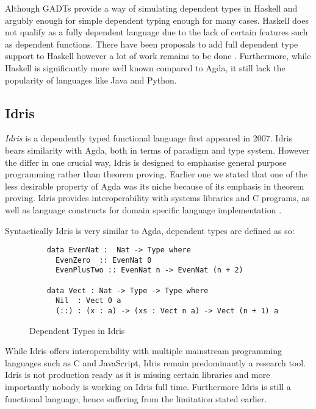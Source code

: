 \documentclass[a4paper,12pt]{report}
\begin{document}
\par
Although GADTs provide a way of simulating dependent types in Haskell and 
argubly enough for simple dependent typing enough for many cases. 
Haskell does not qualify as a fully dependent 
language due to the lack of certain features such as dependent functions. There 
have been proposals to add full dependent type support to Haskell however a lot 
of work remains to be done \cite{dependentHaskell, aRoleForDependentHaskell}. 
Furthermore, while Haskell is significantly more well known compared to Agda, it 
still lack the popularity of languages like Java and Python.

\subsection{Idris}
\textit{Idris} \cite{idris} is a dependently typed functional language first 
appeared in 2007. Idris bears similarity with Agda, both in terms of paradigm 
and type system. However the differ in one crucial way, Idris is designed to 
emphasise general purpose programming rather than theorem proving. Earlier one 
we stated that one of the less desirable property of Agda was its niche because 
of its emphasis in theorem proving. Idris provides 
interoperability with systems libraries and C programs, 
as well as language constructs for domain specific language 
implementation \cite{gpIdris}. 

\par
Syntactically Idris is very similar to Agda, dependent types are defined as so: 
\begin{figure}[H]
  \begin{lstlisting}      
    data EvenNat :  Nat -> Type where
      EvenZero  :: EvenNat 0
      EvenPlusTwo :: EvenNat n -> EvenNat (n + 2)
      
    data Vect : Nat -> Type -> Type where
      Nil  : Vect 0 a
      (::) : (x : a) -> (xs : Vect n a) -> Vect (n + 1) a
  \end{lstlisting}
  \caption{Dependent Types in Idris}
\end{figure}

\par
While Idris offers interoperability with multiple mainstream programming 
languages such as C and JavaScript, Idris remain predominantly a research tool. 
Idris is not production ready \cite{gpIdris} as it is missing certain libraries 
and more importantly nobody is working on Idris full time. Furthermore Idris is 
still a functional language, hence suffering from the limitation stated earlier. 
\end{document}
